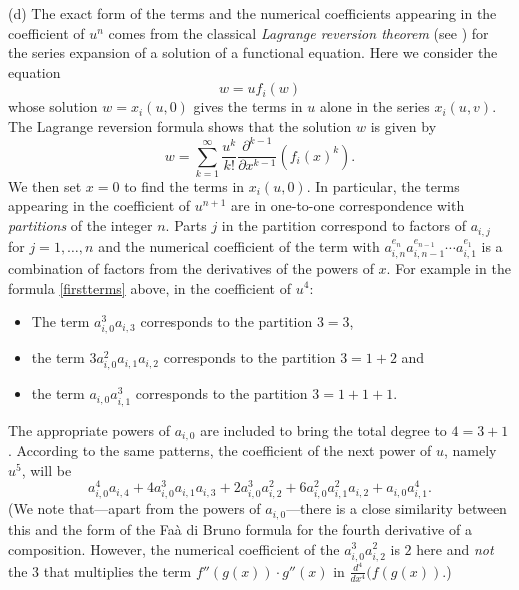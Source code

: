 \documentclass[12pt]{amsart}
\theoremstyle{theorem}
\begin{document}
\vskip 10pt
\noindent
(d)  The exact form of the terms and the numerical coefficients appearing in the coefficient of $u^n$ comes from 
the classical \emph{Lagrange reversion theorem} (see \cite[p. 132--133]{WW}) for the series expansion of a solution of a functional equation.  Here
we consider the equation
$$w = u f_i(w)$$
whose solution $w = x_i(u,0)$ gives the terms in $u$ alone in the series $x_i(u,v)$.
The Lagrange reversion formula shows that the solution $w$ is given by 
$$w = \sum_{k=1}^\infty \frac{u^k}{k!} \frac{\partial^{k-1}}{\partial x^{k-1}}\left(f_i(x)^k\right).$$
We then set $x = 0$ to find the terms in $x_i(u,0)$.  In particular, the terms
appearing in the coefficient of $u^{n+1}$ are in one-to-one correspondence with \emph{partitions} of the 
integer $n$.  Parts $j$ in the partition correspond to factors of $a_{i,j}$ for $j = 1, \ldots, n$ and the numerical
coefficient of the term with $a_{i,n}^{e_n} a_{i,n-1}^{e_{n-1}} \cdots a_{i,1}^{e_1}$ is a combination of factors from
the derivatives of the powers of $x$.
For example in the formula \eqref{firstterms} above, in the coefficient of $u^4$:
\begin{itemize}
\item The term $a_{i,0}^3 a_{i,3}$ corresponds to the partition $3 = 3$,
\item the term $3 a_{i,0}^2 a_{i,1}a_{i,2}$ corresponds to the partition $3 = 1 + 2$ 
and
\item the term $a_{i,0} a_{i,1}^3 $ corresponds to the partition $3 = 1 + 1 + 1$.
\end{itemize}
The appropriate powers of $a_{i,0}$ are included to bring the total degree to $4 = 3 + 1$.
According to the same patterns, the coefficient of the next power of $u$, namely $u^5$, will be
$$a_{i,0}^4 a_{i,4} + 4 a_{i,0}^3 a_{i,1} a_{i,3} + 2 a_{i,0}^3 a_{i,2}^2 + 6 a_{i,0}^2 a_{i,1}^2 a_{i,2} + a_{i,0} a_{i,1}^4.$$
(We note that---apart from the powers of $a_{i,0}$---there is a close similarity between this
and the form of the Fa\`a di Bruno formula for the fourth derivative of a composition.  However, the numerical coefficient 
of the $a_{i,0}^3 a_{i,2}^2$ is $2$ here and \emph{not} the $3$ that multiplies the term 
$f''(g(x)) \cdot g''(x)$ in $\frac{d^4}{dx^4}(f(g(x))$.)
\end{document}
